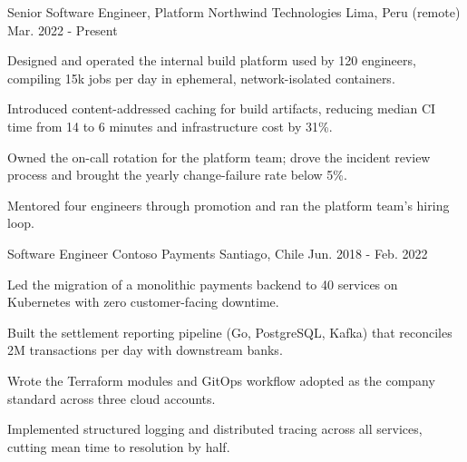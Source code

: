 

\begin{cventries}

  \cventry
    {Senior Software Engineer, Platform} %
    {Northwind Technologies} %
    {Lima, Peru (remote)} %
    {Mar. 2022 - Present} %
    {
      \begin{cvitems} %
        \item {Designed and operated the internal build platform used by 120 engineers, compiling 15k jobs per day in ephemeral, network-isolated containers.}
        \item {Introduced content-addressed caching for build artifacts, reducing median CI time from 14 to 6 minutes and infrastructure cost by 31\%.}
        \item {Owned the on-call rotation for the platform team; drove the incident review process and brought the yearly change-failure rate below 5\%.}
        \item {Mentored four engineers through promotion and ran the platform team's hiring loop.}
      \end{cvitems}
    }

  \cventry
    {Software Engineer} %
    {Contoso Payments} %
    {Santiago, Chile} %
    {Jun. 2018 - Feb. 2022} %
    {
      \begin{cvitems} %
        \item {Led the migration of a monolithic payments backend to 40 services on Kubernetes with zero customer-facing downtime.}
        \item {Built the settlement reporting pipeline (Go, PostgreSQL, Kafka) that reconciles 2M transactions per day with downstream banks.}
        \item {Wrote the Terraform modules and GitOps workflow adopted as the company standard across three cloud accounts.}
        \item {Implemented structured logging and distributed tracing across all services, cutting mean time to resolution by half.}
      \end{cvitems}
    }


\end{cventries}
